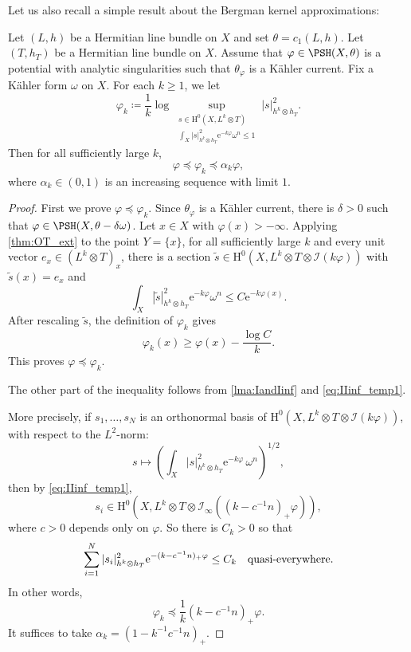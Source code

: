 Let us also recall a simple result about the Bergman kernel approximations:
\begin{proposition}\label{prop:Bergman_approx}
Let $(L,h)$ be a Hermitian line bundle on $X$ and set $\theta=c_1(L,h)$. Let $(T,h_T)$ be a Hermitian line bundle on $X$. Assume that $\varphi\in \PSH(X,\theta)$ is a potential with analytic singularities such that $\theta_{\varphi}$ is a K\"ahler current. Fix a K\"ahler form $\omega$ on $X$.
For each $k\geq 1$, we let
\begin{equation}\label{eq:Bergman_seq_def}
\varphi_k \coloneqq \frac{1}{k} \log \sup_{\substack{s \in \mathrm{H}^0(X,L^k \otimes T)\\ \int_X |s|^2_{h^k  \otimes h_T}\mathrm{e}^{-k\varphi} \omega^n \leq 1}} |s|^2_{h^k  \otimes h_T}.
\end{equation}
Then for all sufficiently large $k$,
\[
\varphi\preceq \varphi_k\preceq \alpha_k \varphi,
\]
where $\alpha_k\in (0,1)$ is an increasing sequence with limit $1$.
\end{proposition}
\begin{proof}

First we prove $\varphi\preceq \varphi_k$. Since $\theta_{\varphi}$ is a K\"ahler current, there is $\delta>0$ such that $\varphi\in \PSH(X,\theta-\delta\omega)$. Let $x\in X$ with $\varphi(x)>-\infty$. Applying \cref{thm:OT_ext} to the point $Y=\{x\}$, for all sufficiently large $k$ and every unit vector $e_x\in (L^k\otimes T)_x$, there is a section $\tilde{s}\in \mathrm{H}^0(X,L^k\otimes T\otimes \mathcal{I}(k\varphi))$ with $\tilde{s}(x)=e_x$ and
\[
    \int_X |\tilde{s}|^2_{h^k\otimes h_T}\mathrm{e}^{-k\varphi}\omega^n\leq C\mathrm{e}^{-k\varphi(x)}.
\]
After rescaling $\tilde{s}$, the definition of $\varphi_k$ gives
\[
    \varphi_k(x)\geq \varphi(x)-\frac{\log C}{k}.
\]
This proves $\varphi\preceq\varphi_k$.

The other part of the inequality follows from \cref{lma:IandIinf} and \eqref{eq:IIinf_temp1}.

More precisely, if $s_1,\ldots,s_N$ is an orthonormal basis of $\mathrm{H}^0(X,L^k\otimes T\otimes \mathcal{I}(k\varphi))$, with respect to the $L^2$-norm:
\[
s\mapsto \left( \int_X |s|^2_{h^k\otimes h_T}\mathrm{e}^{-k\varphi}\,\omega^n \right)^{1/2},
\]
then by \eqref{eq:IIinf_temp1},
\[
s_i\in \mathrm{H}^0\left(X,L^k\otimes T\otimes \mathcal{I}_{\infty}\left((k-c^{-1}n)_+\varphi\right)\right),
\]
where $c>0$ depends only on $\varphi$. So there is $C_k>0$ so that
\[
\sum_{i=1}^N |s_i|^2_{h^k\otimes h_T}\mathrm{e}^{-(k-c^{-1}n)_+\varphi}\leq C_k\quad \textup{quasi-everywhere}.
\]
In other words,
\[
\varphi_k\preceq \frac{1}{k}\left( k-c^{-1}n \right)_+ \varphi.
\]
It suffices to take $\alpha_k=(1-k^{-1}c^{-1}n)_+$.
\end{proof}
